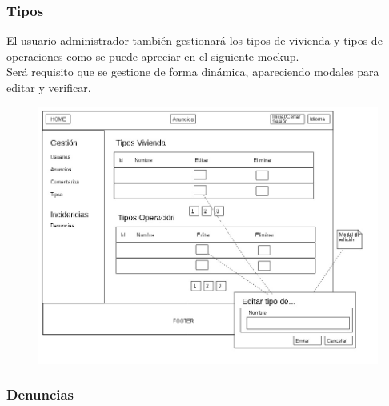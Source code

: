 \subsubsection{Tipos}
El usuario administrador tambi\'{e}n gestionar\'{a} los tipos de vivienda y tipos de operaciones como se puede apreciar en el siguiente mockup.\\

Ser\'{a} requisito que se gestione de forma din\'{a}mica, apareciendo modales para editar y verificar. 

\begin{figure}[h!]
\centering
\includegraphics[width=1\textwidth]{Img/VisionAplicacion/vision_12.jpg}
\end{figure}

\subsubsection{Denuncias}

